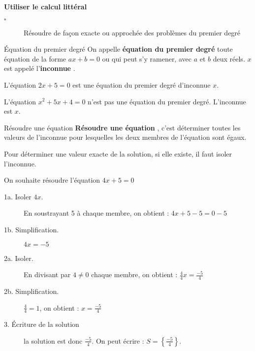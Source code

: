 \begin{titre}

\end{titre}


\begin{CpsCol}
\textbf{Utiliser le calcul littéral}
\begin{description}
\item[$\square$] Résoudre de façon exacte ou approchée des problèmes du premier degré
\end{description}
\end{CpsCol}




\begin{DefT}{Équation du premier degré}
On appelle \textbf{équation du premier degré} toute équation de la forme $ax+b=0$ ou qui peut s'y ramener, avec $a$ et $b$ deux réels. $x$ est appelé l'\textbf{inconnue} .
\end{DefT}

  
\begin{Ex}   
\begin{description}
\item L'équation $2x+5=0$ est une équation du premier degré d'inconnue $x$.
\item L'équation $x^2+5x+4=0$ n'est pas une équation du premier degré. L'inconnue est $x$.
\end{description}
\end{Ex}


\begin{DefT}{Résoudre une équation}
\textbf{Résoudre une équation} , c'est déterminer toutes les valeurs de l'inconnue pour lesquelles les deux membres de l'équation sont égaux.
\end{DefT}


\begin{Mt}   
Pour déterminer une valeur exacte de la solution, si elle existe, il faut isoler l'inconnue.

On souhaite résoudre l'équation $4x + 5 = 0$
\begin{description}
\item[1a. Isoler $4x$.] En soustrayant 5 à chaque membre, on obtient : $4x + 5 -5 = 0 - 5$ 
\item[1b. Simplification.]  $4x = - 5$ 
\item[2a. Isoler.]  En divisant par $4 \neq 0$ chaque membre, on obtient : $\frac{4}{4}x = \frac{-5}{4}$ 
\item[2b. Simplification.]  $\frac{4}{4}=1$, on obtient : $x = \frac{-5}{4}$ 
\item[3. Écriture de la solution] la solution est donc $ \frac{-5}{4}$. On peut écrire : $S=\left\lbrace  \frac{-5}{4} \right\rbrace $.
\end{description}
\end{Mt}


